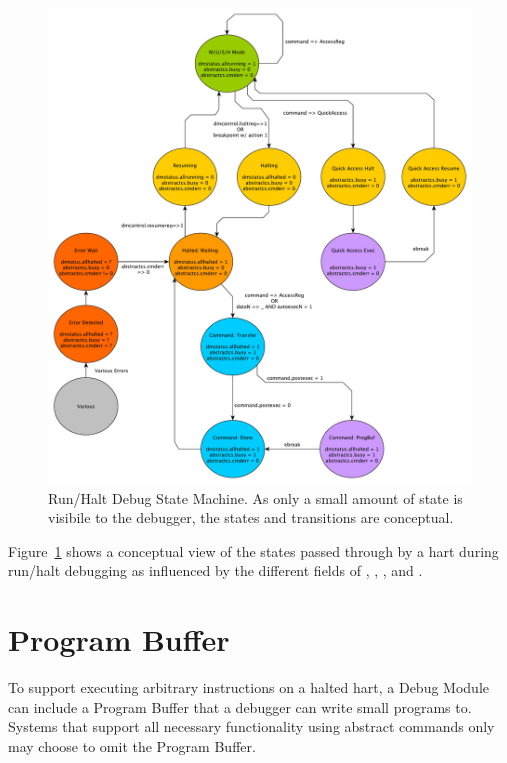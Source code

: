 \begin{figure}
   \centering
   \includegraphics[width=\textwidth]{fig/abstract_commands.pdf}
   \caption[Run/Halt Debug State Machine]{Run/Halt Debug State Machine.
     As only a small amount of state is visibile to the debugger,
     the states and transitions are conceptual.}
   \label{fig:abstract_sm}
\end{figure}

Figure~\ref{fig:abstract_sm} shows a conceptual view of the states
passed through by a hart during run/halt debugging as influenced
by the different fields of \Rdmcontrol, \Rabstractcs, \Rabstractauto, and
\Rcommand.

\section{Program Buffer} \label{programbuffer}

To support executing arbitrary instructions on a halted hart,
a Debug Module can include a 
Program Buffer that a debugger can write small programs to. Systems
that support all necessary functionality using abstract commands
only may choose to omit the Program Buffer.

